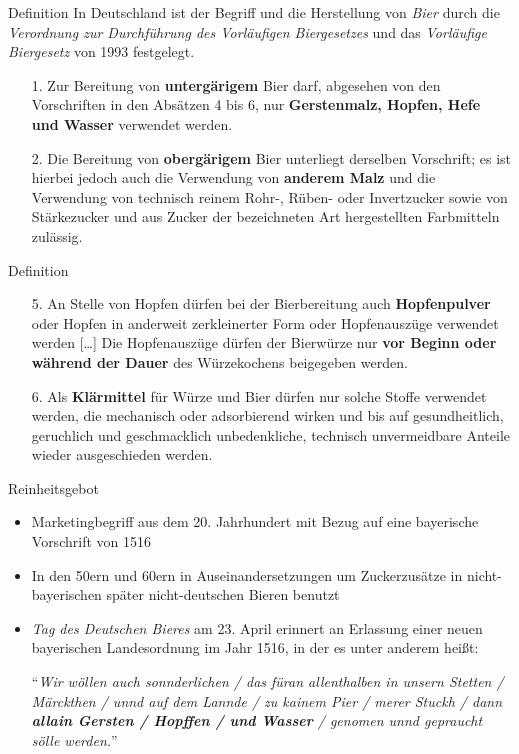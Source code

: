 \documentclass[9pt, ngerman]{beamer}
\begin{document}
\begin{frame}{Definition}
  In Deutschland ist der Begriff und die Herstellung von \emph{Bier} durch die
  \emph{Verordnung zur Durchführung des Vorläufigen Biergesetzes} und das
  \emph{Vorläufige Biergesetz} von 1993 festgelegt.

  \begin{enumerate}
    \item[1.] Zur Bereitung von \textbf{untergärigem} Bier darf, abgesehen von den
      Vorschriften in den Absätzen 4 bis 6, nur \textbf{Gerstenmalz, Hopfen, Hefe und
      Wasser} verwendet werden.
    \item[2.] Die Bereitung von \textbf{obergärigem} Bier unterliegt derselben
      Vorschrift; es ist hierbei jedoch auch die Verwendung von \textbf{anderem
      Malz} und die Verwendung von technisch reinem Rohr-, Rüben- oder
      Invertzucker sowie von Stärkezucker und aus Zucker der bezeichneten Art
      hergestellten Farbmitteln zulässig.
  \end{enumerate}
\end{frame}
\begin{frame}{Definition}
  \begin{enumerate}
    \item[5.] An Stelle von Hopfen dürfen bei der Bierbereitung auch
      \textbf{Hopfenpulver} oder Hopfen in anderweit zerkleinerter Form oder
      Hopfenauszüge verwendet werden [\dots] Die Hopfenauszüge dürfen der
      Bierwürze nur \textbf{vor Beginn oder während der Dauer} des Würzekochens
      beigegeben werden.

    \item[6.] Als \textbf{Klärmittel} für Würze und Bier dürfen nur solche
      Stoffe verwendet werden, die mechanisch oder adsorbierend wirken und bis
      auf gesundheitlich, geruchlich und geschmacklich unbedenkliche, technisch
      unvermeidbare Anteile wieder ausgeschieden werden.
  \end{enumerate}
\end{frame}
\begin{frame}{Reinheitsgebot}
  \begin{itemize}
    \item Marketingbegriff aus dem 20. Jahrhundert mit Bezug auf eine
      bayerische Vorschrift von 1516
    \item In den 50ern und 60ern in Auseinandersetzungen um Zuckerzusätze
      in nicht-bayerischen später nicht-deutschen Bieren benutzt
    \item \emph{Tag des Deutschen Bieres} am 23. April erinnert an Erlassung
      einer neuen bayerischen Landesordnung im Jahr 1516, in der es unter
      anderem heißt:

      \enquote{\emph{Wir wöllen auch sonnderlichen / das füran
      allenthalben in unsern Stetten / Märckthen / unnd auf dem Lannde / zu
      kainem Pier / merer Stuckh / dann \textbf{allain Gersten / Hopffen / und
      Wasser} /
      genomen unnd gepraucht sölle werden.}}
  \end{itemize}
\end{frame}
\end{document}
